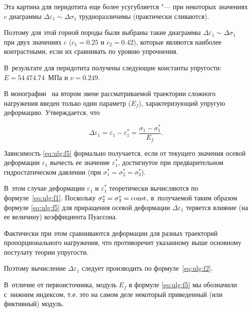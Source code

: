 Эта картина для перидотита еще более усугубляется "--- при некоторых значениях $c$ диаграммы $\Delta\varepsilon_1\sim \Delta\sigma_1$ трудноразличимы (практически сливаются). 

Поэтому для этой горной породы были выбраны такие диаграммы $\Delta\varepsilon_1\sim \Delta\sigma_1$ при двух значениях $c$ ($c_1=0.25$ и $c_2=0.42$), которые являются наиболее контрастными, если их сравнивать по уровню упрочнения. 

В~результате для перидотита получены следующие константы упругости: $E=54\,474.74$~МПа и $\nu=0.249$.







В монографии~\cite{ulg:bib:Mogi} на втором звене рассматриваемой траектории сложного нагружения введен только один параметр ($E_f$), характеризующий упругую деформацию. Утверждается, что

\begin{equation} \label{eq:ulg:f5} 

\Delta\varepsilon_1=\varepsilon_1-\varepsilon_1^*=\frac{\sigma_1-\sigma_1^*}{E_f}.

\end{equation}  

Зависимость \eqref{eq:ulg:f5} формально получается, если от текущего значения осевой деформации $\varepsilon_1$ вычесть ее значение $\varepsilon_1^*$, достигнутое при предварительном гидростатическом давлении (при $\sigma_1^*=\sigma_2^*=\sigma_3^*$). 

В~этом случае деформации $\varepsilon_1$ и $\varepsilon_1^*$ теоретически вычисляются по формуле~\eqref{eq:ulg:f1}. Поскольку $\sigma_2^*=\sigma_3^*={\rm const}$, в~получаемой таким образом формуле \eqref{eq:ulg:f5} для приращения осевой деформации $\Delta\varepsilon_1$ теряется влияние (на ее величину) коэффициента Пуассона.  

Фактически при этом сравниваются деформации для разных траекторий пропорционального нагружения, что противоречит указанному выше основному постулату теории упругости. 

Поэтому вычисление $\Delta\varepsilon_1$ следует производить по формуле~\eqref{eq:ulg:f2}.

В~отличие от первоисточника, модуль $E_f$ в формуле \eqref{eq:ulg:f5} мы обозначили с~нижним индексом, т.е. это на самом деле некоторый приведенный (или фиктивный) модуль. 

